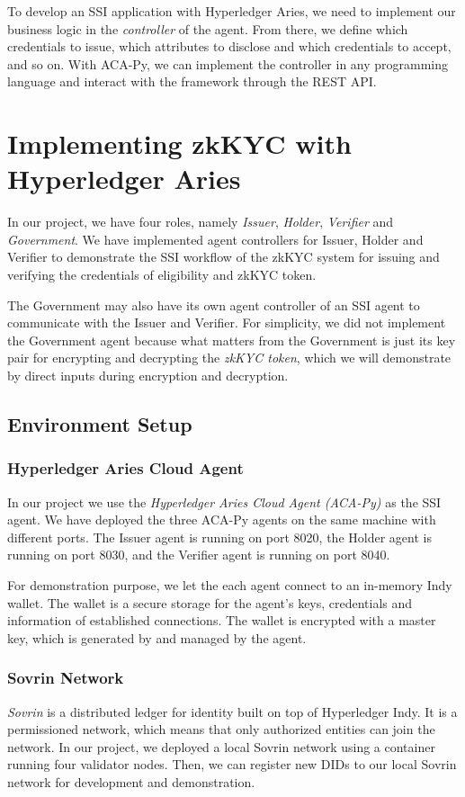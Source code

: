 \documentclass[
]{report}
\begin{document}
To develop an SSI application with Hyperledger Aries, we need to
implement our business logic in the \emph{controller} of the agent.  
From there, we define which credentials to issue, which attributes to
disclose and which credentials to accept, and so on. With ACA-Py, we
can implement the controller in any programming language and interact
with the framework through the REST API.

\section{Implementing zkKYC with Hyperledger Aries}

In our project, we have four roles, namely \emph{Issuer}, \emph{Holder},
\emph{Verifier} and \emph{Government}. We have implemented agent controllers
for Issuer, Holder and Verifier to demonstrate the SSI workflow of the
zkKYC system for issuing and verifying the credentials of eligibility and
zkKYC token.

The Government may also have its own agent controller of
an SSI agent to communicate with the Issuer and Verifier. For simplicity,
we did not implement the Government agent because what matters from the
Government is just its key pair for encrypting and decrypting the
\emph{zkKYC token}, which we will demonstrate by direct inputs during
encryption and decryption.

\subsection{Environment Setup}
\subsubsection{Hyperledger Aries Cloud Agent}
In our project we use the \emph{Hyperledger Aries Cloud Agent (ACA-Py)}
as the SSI agent. We have deployed the three ACA-Py agents on the same
machine with different ports. The Issuer agent is running on port 8020,
the Holder agent is running on port 8030, and the Verifier agent is
running on port 8040.

For demonstration purpose, we let the each agent connect to an in-memory
Indy wallet. The wallet is a secure storage for the agent's keys,
credentials and information of established connections. The wallet is
encrypted with a master key, which is generated by and managed by the
agent.

\subsubsection{Sovrin Network}
\emph{Sovrin} is a distributed ledger for identity built on top of
Hyperledger Indy. It is a permissioned network, which means that only
authorized entities can join the network. In our project, we deployed a
local Sovrin network using a container running four validator nodes.
Then, we can register new DIDs to our local Sovrin network for development
and demonstration.
\end{document}
